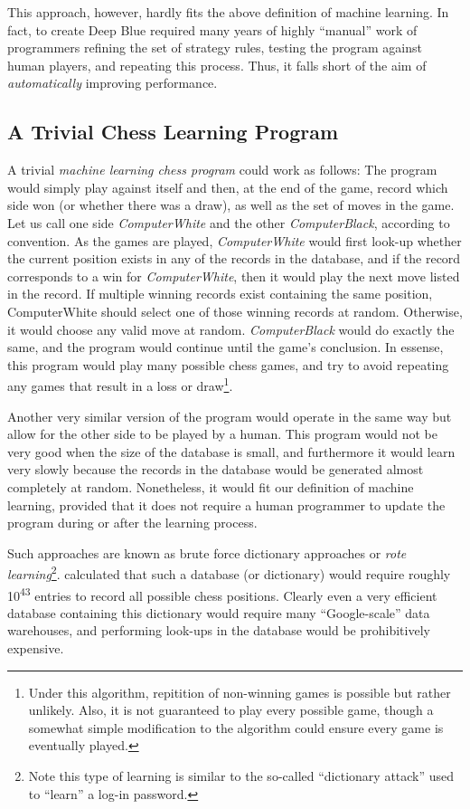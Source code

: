 This approach, however, hardly fits the above definition of machine learning. In fact, to create Deep Blue required many years of highly ``manual'' work of programmers refining the set of strategy rules, testing the program against human players, and repeating this process. Thus, it falls short of the aim of \emph{automatically} improving performance.

\subsection{A Trivial Chess Learning Program}
\label{sec:trivial-learning}

A trivial \emph{machine learning chess program} could work as follows: The program would simply play against itself and then, at the end of the game, record which side won (or whether there was a draw), as well as the set of moves in the game. Let us call one side \emph{ComputerWhite} and the other \emph{ComputerBlack}, according to convention. As the games are played, \emph{ComputerWhite} would first look-up whether the current position exists in any of the records in the database, and if the record corresponds to a win for \emph{ComputerWhite}, then it would play the next move listed in the record. If multiple winning records exist containing the same position, ComputerWhite should select one of those winning records at random.  Otherwise, it would choose any valid move at random. \emph{ComputerBlack} would do exactly the same, and the program would continue until the game's conclusion. In essense, this program would play many possible chess games, and try to avoid repeating any games that result in a loss or draw\footnote{Under this algorithm, repitition of non-winning games is possible but rather unlikely. Also, it is not guaranteed to play every possible game, though a somewhat simple modification to the algorithm could ensure every game is eventually played.}.

Another very similar version of the program would operate in the same way but allow for the other side to be played by a human. This program would not be very good when the size of the database is small, and furthermore it would learn very slowly because the records in the database would be generated almost completely at random. Nonetheless, it would fit our definition of machine learning, provided that it does not require a human programmer to update the program during or after the learning process.

Such approaches are known as brute force dictionary approaches or \emph{rote learning}\footnote{Note this type of learning is similar to the so-called ``dictionary attack'' used to ``learn'' a log-in password.}. \cite{shannon1950xxii} calculated that such a database (or dictionary) would require roughly 10\textsuperscript{43} entries to record all possible chess positions. Clearly even a very efficient database containing this dictionary would require many ``Google-scale'' data warehouses, and performing look-ups in the database would be prohibitively expensive.  

